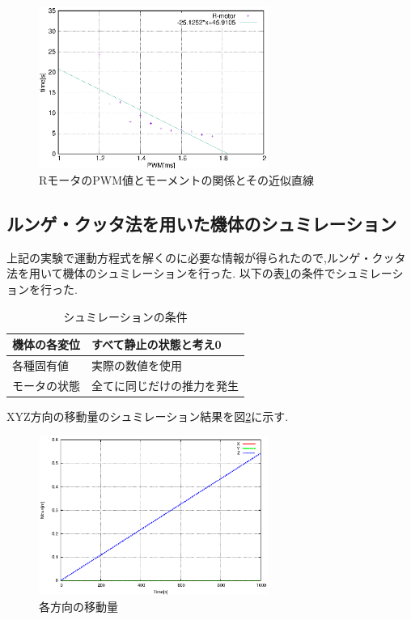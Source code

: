 \documentclass[12pt,oneside]{sotsuken_paper}
\begin{document}
\begin{figure}[htbp]
	\begin{center}
		\includegraphics[width=75mm]{image/moment/moment-R.eps}
		\caption{RモータのPWM値とモーメントの関係とその近似直線}
		\label{fig:moment-R}
	\end{center}
\end{figure}

\subsection{ルンゲ・クッタ法を用いた機体のシュミレーション}
上記の実験で運動方程式を解くのに必要な情報が得られたので,ルンゲ・クッタ法を用いて機体のシュミレーションを行った.
以下の表\ref{table:syumi}の条件でシュミレーションを行った.

\begin{table}[htbp]
	\begin{center}
		\caption{シュミレーションの条件}
		\begin{tabular}{|l|l|} \hline
			機体の各変位 & すべて静止の状態と考え0 \\ \hline 
			各種固有値 & 実際の数値を使用 \\ \hline
			モータの状態 & 全てに同じだけの推力を発生 \\ \hline
		\end{tabular}
		\label{table:syumi}
	\end{center}
\end{table}

XYZ方向の移動量のシュミレーション結果を図\ref{fig:UVW}に示す.

\begin{figure}[htbp]
	\begin{center}
		\includegraphics[width=75mm]{image/UVW.eps}
		\caption{各方向の移動量}
		\label{fig:UVW}
	\end{center}
\end{figure}
\end{document}
